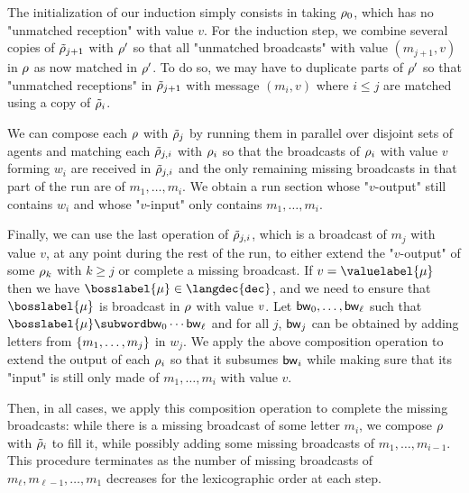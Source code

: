 The initialization of our induction simply consists in taking $\rho_0$, which has no "unmatched reception" with value $v$. For the induction step, we combine several copies of $\Tilde{\rho}_{j+1}$ with $\rho'$ so that all "unmatched broadcasts" with value $(m_{j+1},v)$ in $\rho$ as now matched in $\rho'$. To do so, we may have to duplicate parts of $\rho'$ so that "unmatched receptions" in $\Tilde{\rho}_{j+1}$ with message $(m_i,v)$ where $i \leq j$ are matched using a copy of $\Tilde{\rho}_i$. 

We can compose each $\rho$ with $\Tilde{\rho}_{j}$ by running them in parallel over disjoint sets of agents and matching each $\Tilde{\rho}_{j, i}$ with $\rho_i$ so that the broadcasts of $\rho_i$ with value $v$ forming $w_i$ are received in $\Tilde{\rho}_{j, i}$ and the only remaining missing broadcasts in that part of the run are of $m_1, \ldots, m_i$.
We obtain a run section whose "$v$-output" still contains $w_i$ and whose "$v$-input" only contains $m_1, \ldots, m_i$. 

Finally, we can use the last operation of $\Tilde{\rho}_{j, i}$, which is a broadcast of $m_j$ with value $v$, at any point during the rest of the run, to either extend the "$v$-output" of some $\rho_k$ with $k \geq j$ or complete a missing broadcast.
% 	
If $\val = \valuelabel{\node}$ then we have $\bosslabel{\node} \in \langdec{\decsymb}$, and we need to ensure that $\bosslabel{\node}$ is broadcast in $\rho$ with value $v$.
Let $\mathsf{bw}_0, \ldots, \mathsf{bw}_\ell$ such that $\bosslabel{\node} \subword \bossspec_0\cdots\bossspec_\ell$ and for all $j$, $\mathsf{bw}_j$ can be obtained by adding letters from $\{m_1,\ldots, m_j\}$ in $w_j$.
We apply the above composition operation to extend the output of each $\rho_{i}$ so that it subsumes $\mathsf{bw}_i$ while making sure that its "input" is still only made of $m_1, \ldots, m_i$ with value $v$. 

Then, in all cases, we apply this composition operation to complete the missing broadcasts: while there is a missing broadcast of some letter $m_i$, we compose $\rho$ with $\Tilde{\rho}_i$ to fill it, while possibly adding some missing broadcasts of $m_1, \ldots, m_{i-1}$.
This procedure terminates as the number of missing broadcasts of $m_\ell, m_{\ell-1}, \ldots, m_1$ decreases for the lexicographic order at each step.

